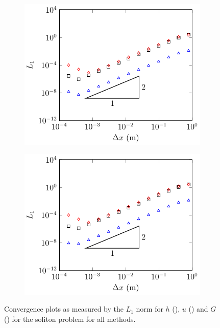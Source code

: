 \begin{figure}
\begin{subfigure}{0.5\textwidth}
		\includegraphics[width=\textwidth]{./chp5/figures/Analytic/Soliton/L1/D.pdf}
		\vspace{0.5cm}
	\end{subfigure}%
	\begin{subfigure}{0.5\textwidth}
		\includegraphics[width=\textwidth]{./chp5/figures/Analytic/Soliton/L1/W.pdf}
		\vspace{0.5cm}
	\end{subfigure}
	\caption{Convergence plots as measured by the $L_1$ norm for $h$ (), $u$ () and $G$ () for the soliton problem for all methods.}
	\label{fig:SolitonL1All}
\end{figure}

